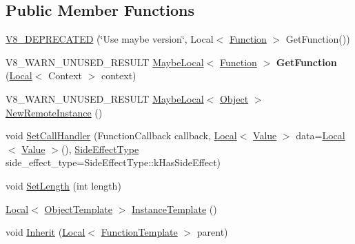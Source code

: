 \subsection*{Public Member Functions}
\begin{DoxyCompactItemize}
\item 
\mbox{\hyperlink{classv8_1_1FunctionTemplate_abd995d08f790cadf070d0fbd2af34b50}{V8\+\_\+\+D\+E\+P\+R\+E\+C\+A\+T\+ED}} (\char`\"{}Use maybe version\char`\"{}, Local$<$ \mbox{\hyperlink{classv8_1_1Function}{Function}} $>$ Get\+Function())
\item 
\mbox{\label{classv8_1_1FunctionTemplate_a77aa424e4ed297452be0412930340262}} 
V8\+\_\+\+W\+A\+R\+N\+\_\+\+U\+N\+U\+S\+E\+D\+\_\+\+R\+E\+S\+U\+LT \mbox{\hyperlink{classv8_1_1MaybeLocal}{Maybe\+Local}}$<$ \mbox{\hyperlink{classv8_1_1Function}{Function}} $>$ {\bfseries Get\+Function} (\mbox{\hyperlink{classv8_1_1Local}{Local}}$<$ Context $>$ context)
\item 
V8\+\_\+\+W\+A\+R\+N\+\_\+\+U\+N\+U\+S\+E\+D\+\_\+\+R\+E\+S\+U\+LT \mbox{\hyperlink{classv8_1_1MaybeLocal}{Maybe\+Local}}$<$ \mbox{\hyperlink{classv8_1_1Object}{Object}} $>$ \mbox{\hyperlink{classv8_1_1FunctionTemplate_a06fffd3d45d4f2f1aec8df075961af59}{New\+Remote\+Instance}} ()
\item 
void \mbox{\hyperlink{classv8_1_1FunctionTemplate_ab7b6e9d60595d4cfd6e1a6b59e625830}{Set\+Call\+Handler}} (Function\+Callback callback, \mbox{\hyperlink{classv8_1_1Local}{Local}}$<$ \mbox{\hyperlink{classv8_1_1Value}{Value}} $>$ data=\mbox{\hyperlink{classv8_1_1Local}{Local}}$<$ \mbox{\hyperlink{classv8_1_1Value}{Value}} $>$(), \mbox{\hyperlink{namespacev8_a29711319c2b9fc7716d65faee2f7b9cb}{Side\+Effect\+Type}} side\+\_\+effect\+\_\+type=Side\+Effect\+Type\+::k\+Has\+Side\+Effect)
\item 
void \mbox{\hyperlink{classv8_1_1FunctionTemplate_a5faf23b28ee3480b23ce054d0f389a75}{Set\+Length}} (int length)
\item 
\mbox{\hyperlink{classv8_1_1Local}{Local}}$<$ \mbox{\hyperlink{classv8_1_1ObjectTemplate}{Object\+Template}} $>$ \mbox{\hyperlink{classv8_1_1FunctionTemplate_a00dd9725566908e8fd14064542f5a781}{Instance\+Template}} ()
\item 
void \mbox{\hyperlink{classv8_1_1FunctionTemplate_abc11c462facf11bafd541892815c5425}{Inherit}} (\mbox{\hyperlink{classv8_1_1Local}{Local}}$<$ \mbox{\hyperlink{classv8_1_1FunctionTemplate}{Function\+Template}} $>$ parent)
\item 

\end{DoxyCompactItemize}
